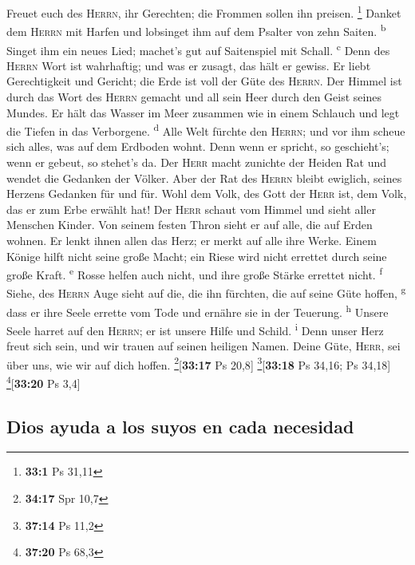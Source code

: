  Freuet euch des \textsc{Herrn}, ihr Gerechten; die
Frommen sollen ihn preisen. \footnote{\textbf{33:1} Ps 31,11}
 Danket dem \textsc{Herrn} mit Harfen und lobsinget ihm
auf dem Psalter von zehn Saiten. \textsuperscript{b} 
Singet ihm ein neues Lied; machet's gut auf Saitenspiel mit Schall.
\textsuperscript{c}  Denn des \textsc{Herrn} Wort ist
wahrhaftig; und was er zusagt, das hält er gewiss.  Er
liebt Gerechtigkeit und Gericht; die Erde ist voll der Güte des
\textsc{Herrn}.  Der Himmel ist durch das Wort des
\textsc{Herrn} gemacht und all sein Heer durch den Geist seines Mundes.
 Er hält das Wasser im Meer zusammen wie in einem Schlauch
und legt die Tiefen in das Verborgene. \textsuperscript{d}
 Alle Welt fürchte den \textsc{Herrn}; und vor ihm scheue
sich alles, was auf dem Erdboden wohnt.  Denn wenn er
spricht, so geschieht's; wenn er gebeut, so stehet's da. 
Der \textsc{Herr} macht zunichte der Heiden Rat und wendet die Gedanken
der Völker.  Aber der Rat des \textsc{Herrn} bleibt
ewiglich, seines Herzens Gedanken für und für.  Wohl dem
Volk, des Gott der \textsc{Herr} ist, dem Volk, das er zum Erbe erwählt
hat!  Der \textsc{Herr} schaut vom Himmel und sieht aller
Menschen Kinder.  Von seinem festen Thron sieht er auf
alle, die auf Erden wohnen.  Er lenkt ihnen allen das
Herz; er merkt auf alle ihre Werke.  Einem Könige hilft
nicht seine große Macht; ein Riese wird nicht errettet durch seine große
Kraft. \textsuperscript{e}  Rosse helfen auch nicht, und
ihre große Stärke errettet nicht. \textsuperscript{f} 
Siehe, des \textsc{Herrn} Auge sieht auf die, die ihn fürchten, die auf
seine Güte hoffen, \textsuperscript{g}  dass er ihre
Seele errette vom Tode und ernähre sie in der Teuerung.
\textsuperscript{h}  Unsere Seele harret auf den
\textsc{Herrn}; er ist unsere Hilfe und Schild. \textsuperscript{i}
 Denn unser Herz freut sich sein, und wir trauen auf
seinen heiligen Namen.  Deine Güte, \textsc{Herr}, sei
über uns, wie wir auf dich hoffen. \footnote{\textbf{34:17} Spr 10,7}{[}\textbf{33:17}
Ps 20,8{]} \footnote{\textbf{37:14} Ps 11,2}{[}\textbf{33:18} Ps 34,16;
Ps 34,18{]} \footnote{\textbf{37:20} Ps 68,3}{[}\textbf{33:20} Ps 3,4{]}

\hypertarget{dios-ayuda-a-los-suyos-en-cada-necesidad}{%
\subsection{Dios ayuda a los suyos en cada
necesidad}\label{dios-ayuda-a-los-suyos-en-cada-necesidad}}

